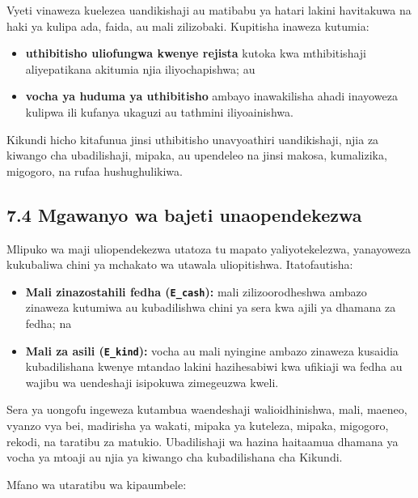 \documentclass[11pt]{article}
\begin{document}
Vyeti vinaweza kuelezea uandikishaji au matibabu ya hatari lakini havitakuwa na haki ya kulipa ada, faida, au mali zilizobaki. Kupitisha inaweza kutumia:

\begin{itemize}[leftmargin=*]
\item \textbf{uthibitisho uliofungwa kwenye rejista} kutoka kwa mthibitishaji aliyepatikana akitumia njia iliyochapishwa; au
\item \textbf{vocha ya huduma ya uthibitisho} ambayo inawakilisha ahadi inayoweza kulipwa ili kufanya ukaguzi au tathmini iliyoainishwa.
\end{itemize}
Kikundi hicho kitafunua jinsi uthibitisho unavyoathiri uandikishaji, njia za kiwango cha ubadilishaji, mipaka, au upendeleo na jinsi makosa, kumalizika, migogoro, na rufaa hushughulikiwa.

\subsection*{7.4 Mgawanyo wa bajeti unaopendekezwa}

Mlipuko wa maji uliopendekezwa utatoza tu mapato yaliyotekelezwa, yanayoweza kukubaliwa chini ya mchakato wa utawala uliopitishwa. Itatofautisha:

\begin{itemize}[leftmargin=*]
\item \textbf{Mali zinazostahili fedha (\texttt{E\_cash}):} mali zilizoorodheshwa ambazo zinaweza kutumiwa au kubadilishwa chini ya sera kwa ajili ya dhamana za fedha; na
\item \textbf{Mali za asili (\texttt{E\_kind}):} vocha au mali nyingine ambazo zinaweza kusaidia kubadilishana kwenye mtandao lakini hazihesabiwi kwa ufikiaji wa fedha au wajibu wa uendeshaji isipokuwa zimegeuzwa kweli.
\end{itemize}
Sera ya uongofu ingeweza kutambua waendeshaji walioidhinishwa, mali, maeneo, vyanzo vya bei, madirisha ya wakati, mipaka ya kuteleza, mipaka, migogoro, rekodi, na taratibu za matukio. Ubadilishaji wa hazina haitaamua dhamana ya vocha ya mtoaji au njia ya kiwango cha kubadilishana cha Kikundi.

Mfano wa utaratibu wa kipaumbele:
\end{document}
